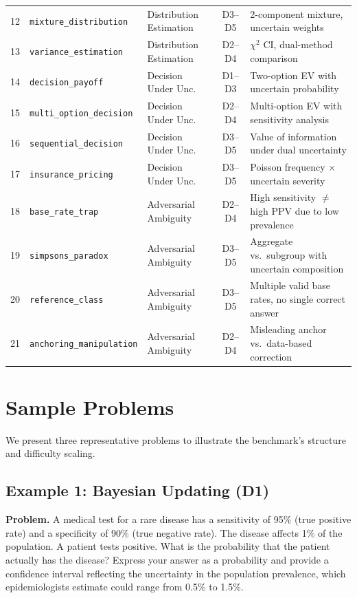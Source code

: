 \documentclass{article}
\begin{document}
\begin{table}[h]
{\begin{tabular}{rllcl}
12 & \texttt{mixture\_distribution} & Distribution Estimation & D3--D5 & 2-component mixture, uncertain weights \\
13 & \texttt{variance\_estimation} & Distribution Estimation & D2--D4 & $\chi^2$ CI, dual-method comparison \\
\midrule
14 & \texttt{decision\_payoff} & Decision Under Unc. & D1--D3 & Two-option EV with uncertain probability \\
15 & \texttt{multi\_option\_decision} & Decision Under Unc. & D2--D4 & Multi-option EV with sensitivity analysis \\
16 & \texttt{sequential\_decision} & Decision Under Unc. & D3--D5 & Value of information under dual uncertainty \\
17 & \texttt{insurance\_pricing} & Decision Under Unc. & D3--D5 & Poisson frequency $\times$ uncertain severity \\
\midrule
18 & \texttt{base\_rate\_trap} & Adversarial Ambiguity & D2--D4 & High sensitivity $\neq$ high PPV due to low prevalence \\
19 & \texttt{simpsons\_paradox} & Adversarial Ambiguity & D3--D5 & Aggregate vs.\ subgroup with uncertain composition \\
20 & \texttt{reference\_class} & Adversarial Ambiguity & D3--D5 & Multiple valid base rates, no single correct answer \\
21 & \texttt{anchoring\_manipulation} & Adversarial Ambiguity & D2--D4 & Misleading anchor vs.\ data-based correction \\
\bottomrule
\end{tabular}}
\end{table}


\section{Sample Problems}
\label{app:samples}

We present three representative problems to illustrate the benchmark's structure and difficulty scaling.

\subsection*{Example 1: Bayesian Updating (D1)}

\noindent\textbf{Problem.}
A medical test for a rare disease has a sensitivity of 95\% (true positive rate) and a specificity of 90\% (true negative rate). The disease affects 1\% of the population. A patient tests positive. What is the probability that the patient actually has the disease? Express your answer as a probability and provide a confidence interval reflecting the uncertainty in the population prevalence, which epidemiologists estimate could range from 0.5\% to 1.5\%.
\end{document}
